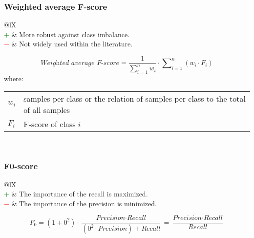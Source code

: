 \documentclass{article}
\makeatletter
\newenvironment{conditions}[1][where:]
    {\hspace{0.02\textwidth} #1 \begin{tabular}[t]{>{$}l<{$} @{${}={}$} l}}
    {\end{tabular}\\[\belowdisplayskip]}
\makeatother
\begin{document}
\subsubsection[Weighted average F-score]{Weighted average F-score \cite{al2016lili, alswaidan2020hybrid}}

\begin{table}[H]\centering
    \begin{tabularx}{\textwidth}{@{}lX}
         \\
        \textcolor{Green}{$+$} & More robust against class imbalance. \\
        \textcolor{Red}{$-$}   & Not widely used within the literature.
    \end{tabularx}
\end{table}

\begin{equation}
    \textit{Weighted average F-score} = \dfrac{1}{\sum\nolimits_{i = 1}^n w_i} \cdot \sum\nolimits_{i = 1}^n (w_i \cdot F_i)
%
    \label{equation:WAF}
\end{equation}
%
\begin{conditions}
    w_i & samples per class or the relation of samples per class to the total of all samples \\
    F_i & F-score of class $i$
\end{conditions}


\subsubsection[F0-score]{F0-score \cite{van2004geometry, taha2015metrics}}

\begin{table}[H]\centering
    \begin{tabularx}{\textwidth}{@{}lX}
         \\
        \textcolor{Green}{$+$} & The importance of the recall is maximized. \\
        \textcolor{Red}{$-$}   & The importance of the precision is minimized.
    \end{tabularx}
\end{table}

\begin{equation}
    F_0 = (1 + 0^2) \cdot \dfrac{\textit{Precision} \cdot \textit{Recall}}{(0^2 \cdot \textit{Precision}) + \textit{Recall}} = \dfrac{\textit{Precision} \cdot \textit{Recall}}{\textit{Recall}}
%
    \label{equation:F0-score}
\end{equation}
\end{document}
